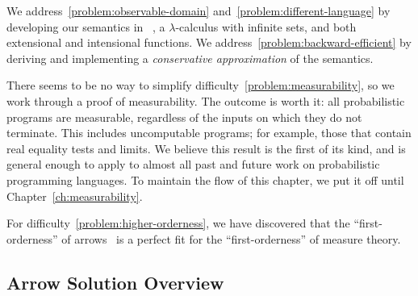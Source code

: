 We address~\ref{problem:observable-domain} and~\ref{problem:different-language} by developing our semantics in \lzfclang~\cite{cit:toronto-2012flops-lzfc}, a $\lambda$-calculus with infinite sets, and both extensional and intensional functions.
We address~\ref{problem:backward-efficient} by deriving and implementing a \emph{conservative approximation} of the semantics.

There seems to be no way to simplify difficulty~\ref{problem:measurability}, so we work through a proof of measurability.
The outcome is worth it: all probabilistic programs are measurable, regardless of the inputs on which they do not terminate.
This includes uncomputable programs; for example, those that contain real equality tests and limits.
We believe this result is the first of its kind, and is general enough to apply to almost all past and future work on probabilistic programming languages.
To maintain the flow of this chapter, we put it off until Chapter~\ref{ch:measurability}.

For difficulty~\ref{problem:higher-orderness}, we have discovered that the ``first-orderness'' of arrows~\cite{cit:hughes-2000scp-arrows} is a perfect fit for the ``first-orderness'' of measure theory.


\subsection{Arrow Solution Overview}

\newcommand{\youarehere}[1]%
{%
\begin{equation}%
\begin{CD}%
X \botto Y   @>\liftmap>>   X \mapto Y   @>\liftpre>>   X \preto Y \\%
@V{\eta_\pbot}VV             @VV{\eta\pmap}V              @VV{\eta\ppre}V\\%
X \pbotto Y  @>>\liftpmap>  X \pmapto Y  @>>\liftppre>  X \ppreto Y%
\end{CD}%
\label{#1}%
\end{equation}%
}

